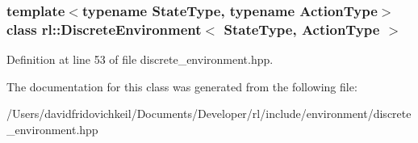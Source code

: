 \subsubsection*{template$<$typename State\+Type, typename Action\+Type$>$\newline
class rl\+::\+Discrete\+Environment$<$ State\+Type, Action\+Type $>$}



Definition at line 53 of file discrete\+\_\+environment.\+hpp.



The documentation for this class was generated from the following file\+:\begin{DoxyCompactItemize}
\item 
/\+Users/davidfridovichkeil/\+Documents/\+Developer/rl/include/environment/discrete\+\_\+environment.\+hpp\end{DoxyCompactItemize}
